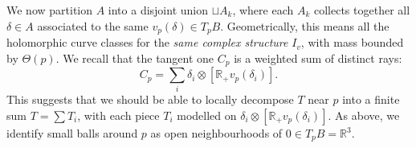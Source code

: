 \documentclass{article}
\theoremstyle{definition}
\newcommand{\R}{\mathbb{R}}
\begin{document}
			
			
			
			
			

	We now partition $A$ into a disjoint union $\sqcup A_k$, where each $A_k$ collects together all $\delta\in A$ associated to the same $v_p(\delta)\in T_p B$. Geometrically, this means all the holomorphic curve classes for the \emph{same complex structure} $I_v$, with mass bounded by $\Theta(p)$. 	We recall that the tangent one $C_p$ is a weighted sum of distinct rays:
	\[
	C_p= \sum_i  \delta_i\otimes   [\R_+ v_p(\delta_i)] .
	\]
	This suggests that we should be able to locally decompose $T$ near $p$ into a finite sum $T=\sum T_i$, with each piece $T_i$ modelled on $ \delta_i\otimes   [\R_+ v_p(\delta_i)] $. As above, we identify small balls around $p$ as open neighbourhoods of $0\in T_p B=\R^3$.
			
			
			
			
			
\end{document}
